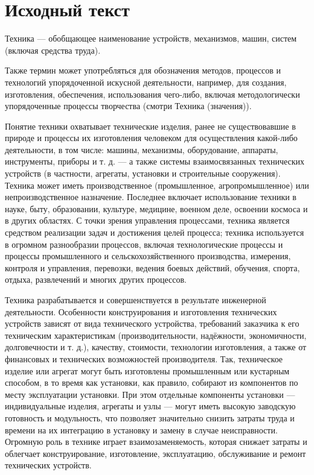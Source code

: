 \documentclass[a4paper, 14pt]{extarticle}
\begin{document}


\tableofcontents
\newpage

\section{Исходный текст}

Техника — обобщающее наименование устройств, механизмов, машин, систем (включая средства труда).

Также термин может употребляться для обозначения методов, процессов и технологий упорядоченной искусной деятельности, например, для создания, изготовления, обеспечения, использования чего-либо, включая методологически упорядоченные процессы творчества (смотри Техника (значения)).

Понятие техники охватывает технические изделия, ранее не существовавшие в природе и процессы их изготовления человеком для осуществления какой-либо деятельности, в том числе: машины, механизмы, оборудование, аппараты, инструменты, приборы и т. д. — а также системы взаимосвязанных технических устройств (в частности, агрегаты, установки и строительные сооружения). Техника может иметь производственное (промышленное, агропромышленное) или непроизводственное назначение. Последнее включает использование техники в науке, быту, образовании, культуре, медицине, военном деле, освоении космоса и в других областях. С точки зрения управления процессами, техника является средством реализации задач и достижения целей процесса; техника используется в огромном разнообразии процессов, включая технологические процессы и процессы промышленного и сельскохозяйственного производства, измерения, контроля и управления, перевозки, ведения боевых действий, обучения, спорта, отдыха, развлечений и многих других процессов.

Техника разрабатывается и совершенствуется в результате инженерной деятельности. Особенности конструирования и изготовления технических устройств зависят от вида технического устройства, требований заказчика к его техническим характеристикам (производительности, надёжности, экономичности, долговечности и т. д.), качеству, стоимости, технологии изготовления, а также от финансовых и технических возможностей производителя. Так, техническое изделие или агрегат могут быть изготовлены промышленным или кустарным способом, в то время как установки, как правило, собирают из компонентов по месту эксплуатации установки. При этом отдельные компоненты установки — индивидуальные изделия, агрегаты и узлы — могут иметь высокую заводскую готовность и модульность, что позволяет значительно снизить затраты труда и времени на их интеграцию в установку и замену в случае неисправности. Огромную роль в технике играет взаимозаменяемость, которая снижает затраты и облегчает конструирование, изготовление, эксплуатацию, обслуживание и ремонт технических устройств.
\end{document}
